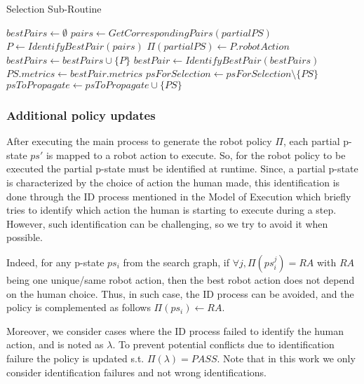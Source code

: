 \begin{algorithm}
\caption{Selection Sub-Routine}\label{alg:selection}
\begin{algorithmic}[1]

        \State $bestPairs \gets \emptyset$
            \State $pairs \gets GetCorrespondingPairs(partialPS)$
            \State $P \gets IdentifyBestPair(pairs)$ 
            \State $\Pi(partialPS) \gets P.robotAction$
            \State $bestPairs \gets bestPairs \cup \{P\}$
        \EndFor
        \State 
        \State $bestPair \gets IdentifyBestPair(bestPairs)$
        \State 
        \State $PS.metrics \gets bestPair.metrics$
        \State $psForSelection \gets psForSelection \setminus \{PS\}$
        \State $psToPropagate \gets psToPropagate \cup \{PS\}$
    \EndIf
\EndFor

\end{algorithmic}
\end{algorithm}

    \subsubsection{Additional policy updates}

After executing the main process to generate the robot policy $\Pi$, each partial p-state $ps'$ is mapped to a robot action to execute. So, for the robot policy to be executed the partial p-state must be identified at runtime. 
Since, a partial p-state is characterized by the choice of action the human made, this identification is done through the ID process mentioned in the Model of Execution which briefly tries to identify which action the human is starting to execute during a step. However, such identification can be challenging, so we try to avoid it when possible. 

Indeed, for any p-state $ps_i$ from the search graph, if $\forall j, \Pi(ps_i^j) = RA$ with $RA$ being one unique/same robot action, then the best robot action does not depend on the human choice. Thus, in such case, the ID process can be avoided, and the policy is complemented as follows $\Pi(ps_i) \gets RA$.

Moreover, we consider cases where the ID process failed to identify the human action, and is noted as $\lambda$. To prevent potential conflicts due to identification failure the policy is updated s.t. $\Pi(\lambda) = PASS$.
Note that in this work we only consider identification failures and not wrong identifications. 


